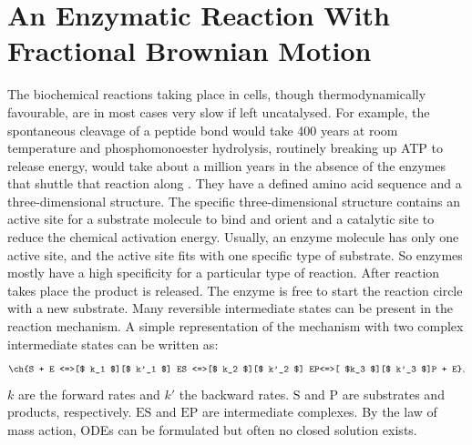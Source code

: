 \documentclass[
  a4paper,BCOR10mm,oneside,
  headsepline,footsepline,%
  fleqn,openbib
]{scrbook}
\begin{document}
\chapter{An Enzymatic Reaction With Fractional Brownian Motion}

The biochemical reactions taking place in cells, though thermodynamically favourable, are in most cases very slow if left uncatalysed. For example, the spontaneous cleavage of a peptide bond would take 400 years at room temperature and phosphomonoester hydrolysis, routinely breaking up ATP to release energy, would take about a million years in the absence of the enzymes that shuttle that reaction along \cite{Wolfenden2001}. They have a defined amino acid sequence and a three-dimensional structure. The specific three-dimensional structure contains an active site for a substrate molecule to bind and orient and a catalytic site to reduce the chemical activation energy. Usually, an enzyme molecule has only one active site, and the active site fits with one specific type of substrate. So enzymes mostly have a high specificity for a particular type of reaction.  After reaction takes place the product is released. The enzyme is free to start the reaction circle with a new substrate. Many reversible intermediate states can be present in the reaction mechanism. A simple representation of the mechanism with two complex intermediate states can be written as:
\begin{align} \label{eq:enyzmescheme}
\ch{S + E <=>[$ k_1 $][$ k'_1 $] ES <=>[$ k_2 $][$ k'_2 $] EP<=>[ $k_3 $][$ k'_3 $]P + E} ,
\end{align}
$k$ are the forward rates and $k'$ the backward rates. $\mathrm{S}$ and $\mathrm{P}$ are substrates and products, respectively. $\mathrm{ES}$ and $\mathrm{EP}$ are intermediate complexes. By the law of mass action, ODEs can be formulated but often no closed solution exists.\par
\end{document}
